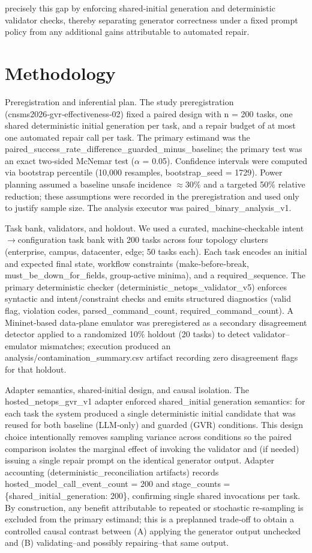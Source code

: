 \documentclass[conference]{IEEEtran}
\begin{document}
precisely this gap by enforcing shared‑initial generation and deterministic validator checks, thereby separating generator correctness under a fixed prompt policy from any additional gains attributable to automated repair.

\section{Methodology}
Preregistration and inferential plan. The study preregistration (cnsms2026‑gvr‑effectiveness‑02) fixed a paired design with n = 200 tasks, one shared deterministic initial generation per task, and a repair budget of at most one automated repair call per task. The primary estimand was the paired\_success\_rate\_difference\_guarded\_minus\_baseline; the primary test was an exact two‑sided McNemar test (\ensuremath{\alpha} = 0.05). Confidence intervals were computed via bootstrap percentile (10,000 resamples, bootstrap\_seed = 1729). Power planning assumed a baseline unsafe incidence \ensuremath{\approx}30\% and a targeted 50\% relative reduction; these assumptions were recorded in the preregistration and used only to justify sample size. The analysis executor was paired\_binary\_analysis\_v1.

Task bank, validators, and holdout. We used a curated, machine‑checkable intent\ensuremath{\rightarrow}configuration task bank with 200 tasks across four topology clusters (enterprise, campus, datacenter, edge; 50 tasks each). Each task encodes an initial and expected final state, workflow constraints (make‑before‑break, must\_be\_down\_for\_fields, group‑active minima), and a required\_sequence. The primary deterministic checker (deterministic\_netops\_validator\_v5) enforces syntactic and intent/constraint checks and emits structured diagnostics (valid flag, violation codes, parsed\_command\_count, required\_command\_count). A Mininet‑based data‑plane emulator was preregistered as a secondary disagreement detector applied to a randomized 10\% holdout (20 tasks) to detect validator--emulator mismatches; execution produced an analysis/contamination\_summary.csv artifact recording zero disagreement flags for that holdout.

Adapter semantics, shared‑initial design, and causal isolation. The hosted\_netops\_gvr\_v1 adapter enforced shared\_initial generation semantics: for each task the system produced a single deterministic initial candidate that was reused for both baseline (LLM‑only) and guarded (GVR) conditions. This design choice intentionally removes sampling variance across conditions so the paired comparison isolates the marginal effect of invoking the validator and (if needed) issuing a single repair prompt on the identical generator output. Adapter accounting (deterministic\_reconciliation artifacts) records hosted\_model\_call\_event\_count = 200 and stage\_counts = \{shared\_initial\_generation: 200\}, confirming single shared invocations per task. By construction, any benefit attributable to repeated or stochastic re‑sampling is excluded from the primary estimand; this is a preplanned trade‑off to obtain a controlled causal contrast between (A) applying the generator output unchecked and (B) validating--and possibly repairing--that same output.
\end{document}
